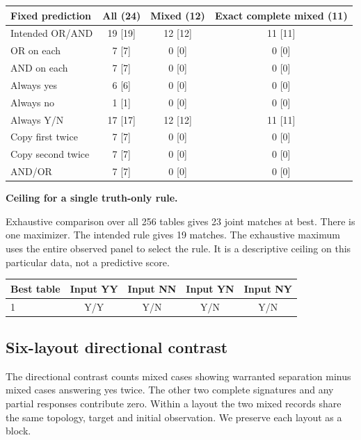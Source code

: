 \documentclass[12pt,letterpaper]{article}
\newcommand{\reading}[2]{\par\smallskip\textsf{\color{accent}\bfseries #1}\enspace #2\par}
\begin{document}
\begin{center}{\small\setlength{\tabcolsep}{4pt}\begin{tabularx}{\linewidth}{@{}Yccc@{}}\toprule
Fixed prediction & All (24) & Mixed (12) & Exact complete mixed (11)\\\midrule
Intended OR/AND & 19 [19] & 12 [12] & 11 [11]\\
OR on each & 7 [7] & 0 [0] & 0 [0]\\
AND on each & 7 [7] & 0 [0] & 0 [0]\\
Always yes & 6 [6] & 0 [0] & 0 [0]\\
Always no & 1 [1] & 0 [0] & 0 [0]\\
Always Y/N & 17 [17] & 12 [12] & 11 [11]\\
Copy first twice & 7 [7] & 0 [0] & 0 [0]\\
Copy second twice & 7 [7] & 0 [0] & 0 [0]\\
AND/OR & 7 [7] & 0 [0] & 0 [0]\\
\bottomrule\end{tabularx}}\end{center}

\reading{Ceiling for a single truth-only rule.}{}Exhaustive comparison over all 256 tables gives 23 joint matches at best. There is one maximizer. The intended rule gives 19 matches. The exhaustive maximum uses the entire observed panel to select the rule. It is a descriptive ceiling on this particular data, not a predictive score.

\begin{center}{\small\setlength{\tabcolsep}{4pt}\begin{tabularx}{\linewidth}{@{}Ycccc@{}}\toprule
Best table & Input YY & Input NN & Input YN & Input NY\\ & Y/Y & Y/N & Y/N & Y/N\\
\bottomrule\end{tabularx}}\end{center}

\subsection{Six-layout directional contrast}

The directional contrast counts mixed cases showing warranted separation minus mixed cases answering yes twice. The other two complete signatures and any partial responses contribute zero. Within a layout the two mixed records share the same topology, target and initial observation. We preserve each layout as a block.
\end{document}
